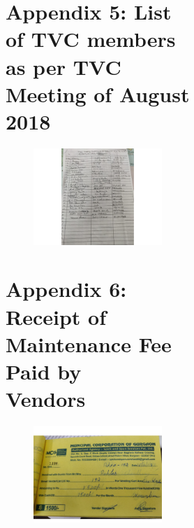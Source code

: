 \documentclass[a4paper, 12pt, twoside]{article}
\begin{document}
\begin{figure}
{\begin{figure}
\begin{figure}
\begin{mdframed}[backgroundcolor=gray!20]
\section*{Appendix 5: List of TVC members as per TVC Meeting of August 2018}
\begin{figure}[h]
\centering
\includegraphics[width=7in]{ListofTVC.pdf}
\end{figure}

\newpage
\section*{Appendix 6: Receipt of Maintenance Fee Paid by \\Vendors}
\begin{figure}[h]
\centering
\includegraphics[width=6in]{Receipt1.pdf}
\end{figure}


\end{mdframed}
\end{figure}
\end{figure}}
\end{figure}
\end{document}
